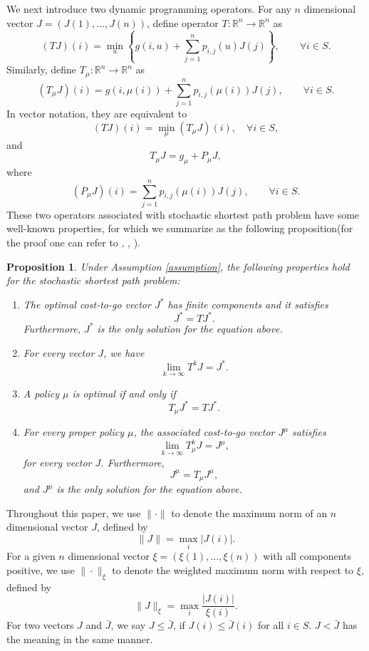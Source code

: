 \documentclass[12pt,a4paper]{amsart}
\numberwithin{equation}{section}
\theoremstyle{plain}
\newtheorem{Prop}[Th]{Proposition}
\theoremstyle{definition}
\begin{document}
We next introduce two dynamic programming operators. For any $n$ dimensional vector $J = (J(1), \dots, J(n))$, define operator $T: \mathbb{R}^n \to \mathbb{R}^n$ as 
$$
(TJ)(i)  = \min_{u} \left\{ g(i, u) + \sum_{j=1}^{n} p_{i,j}(u) J(j)  \right\},  \qquad \forall i \in S.
$$
Similarly, define $T_{\mu}: \mathbb{R}^n \to \mathbb{R}^n$ as 
$$
(T_{\mu}J)(i) = g(i, \mu(i)) + \sum_{j=1}^{n} p_{i,j}(\mu(i)) J(j), \qquad \forall i \in S.  
$$
In vector notation, they are equivalent to
$$
(TJ)(i) = \min_{\mu} (T_{\mu}J)(i), \quad \forall i \in S,
$$
and
$$
T_{\mu} J = g_{\mu} + P_{\mu} J,
$$
where
$$
(P_{\mu} J)(i) =   \sum_{j=1}^{n} p_{i,j}(\mu(i)) J(j), \qquad \forall i \in S.
$$
These two operators associated with stochastic shortest path problem have some well-known properties, for which we summarize as the following proposition(for the proof one can refer to \cite{Be00}, \cite{BeT89}, \cite{BeT91} ).
\begin{Prop}\label{propdp}
	Under Assumption \ref{assumption}, the following properties hold for the stochastic shortest path problem:
	\begin{enumerate}
		\item[(a)] The optimal cost-to-go vector $J^{*}$ has finite components and it satisfies
		\begin{equation*} \label{eqop}
		J^{*}  = TJ^{*}.
		\end{equation*}
		Furthermore, $J^{*}$ is the only solution for the equation above.
		\item[(b)] For every vector $J$, we have
		$$
		\lim_{k \to \infty} T^k J = J^{*}.
		$$
		\item[(c)] A policy $\mu$ is optimal if and only if 
		$$
		T_{\mu} J^{*} = T J^{*}.
		$$
		\item[(d)] For every proper policy $\mu$, the associated cost-to-go vector $J^{\mu}$ satisfies $$
		\lim_{k \to \infty} T_{\mu}^{k} J = J^{\mu},
		$$
		for every vector $J$. Furthermore,
		$$
		J^{\mu} = T_{\mu} J^{\mu},
		$$
		and $J^{\mu}$ is the only solution for the equation above.
	\end{enumerate}
\end{Prop}

Throughout this paper, we use $\|\cdot\|$ to denote the maximum norm of an $n$ dimensional vector $J$,  defined by  
$$\|J\| = \max_{i} |J(i)|.$$ 
For a given $n$ dimensional vector $\xi = \left(\xi(1), \dots, \xi(n) \right)$ with all components positive, we use $\|\cdot\|_{\xi}$ to denote the weighted maximum norm with respect to $\xi$, defined by
$$
\|J\|_{\xi} = \max_{i} \frac{|J(i)|}{\xi(i)}.
$$
For two vectors $J$ and $\bar{J}$, we say $J \le \bar{J}$, if $J(i) \le \bar{J}(i)$ for all $i \in S$. $J < \bar{J}$ has the meaning in the same manner. 
\end{document}
